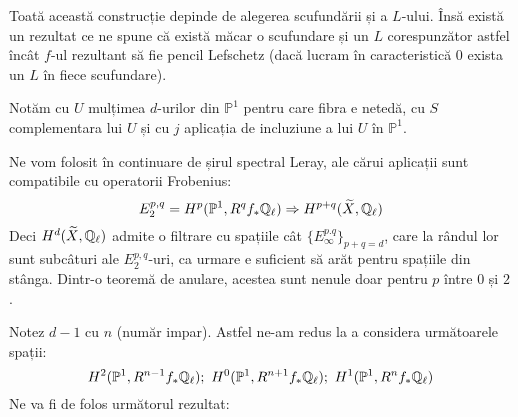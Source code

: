 \documentclass[13pt,openany]{book}
\begin{document}
Toată această construcție depinde de alegerea scufundării și a $L$-ului. Însă există un rezultat ce ne spune că există măcar o scufundare și un $L$ corespunzător astfel încât $f$-ul rezultant să fie pencil Lefschetz (dacă lucram în caracteristică $0$ exista un $L$ în fiece scufundare).

Notăm cu $U$ mulțimea $d$-urilor din $\mathbb{P}^1$ pentru care fibra e netedă, cu $S$ complementara lui $U$ și cu $j$ aplicația de incluziune a lui $U$ în $\mathbb{P}^1$.

Ne vom folosit în continuare de șirul spectral Leray, ale cărui aplicații sunt compatibile cu operatorii Frobenius:
$$E_2^{p,q}=H^p(\mathbb{P}^1,R^q f_* \mathbb{Q}_\ell) \Rightarrow H^{p+q}(\widetilde{X},\mathbb{Q}_\ell)$$
Deci $H^d(\widetilde{X},\mathbb{Q}_\ell)$ admite o filtrare cu spațiile cât $\{E_\infty^{p.q}\}_{p+q=d}$, care la rândul lor sunt subcâturi ale $E_2^{p,q}$-uri, ca urmare e suficient să arăt pentru spațiile din stânga. Dintr-o teoremă de anulare, acestea sunt nenule doar pentru $p$ între $0$ și $2$.

Notez $d-1$ cu $n$ (număr impar). Astfel ne-am redus la a considera următoarele spații:
$$H^2(\mathbb{P}^1,R^{n-1} f_* \Qell);\ H^0(\mathbb{P}^1,R^{n+1} f_* \Qell);\ H^1(\mathbb{P}^1,R^n f_* \Qell)$$
Ne va fi de folos următorul rezultat:
\end{document}
